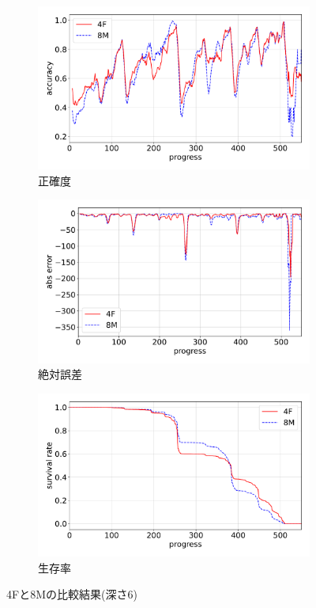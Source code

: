 \begin{figure}[t]
\centering
\begin{subfigure}[b]{0.8\linewidth}
    \includegraphics[width=\linewidth]{pdf/compare/EXP6_NT4F_and_NT8M/accuracy.pdf}
    \caption{正確度}
    \label{fig:EXP6_NT4F_and_NT8M_accuracy}
\end{subfigure}
\begin{subfigure}[b]{0.8\linewidth}
    \includegraphics[width=\linewidth]{pdf/compare/EXP6_NT4F_and_NT8M/error_abs.pdf}
    \caption{絶対誤差}
    \label{fig:EXP6_NT4F_and_NT8M_error_abs}
\end{subfigure}
\begin{subfigure}[b]{0.8\linewidth}
    \includegraphics[width=\linewidth]{pdf/compare/EXP6_NT4F_and_NT8M/survival.pdf}
    \caption{生存率}
    \label{fig:EXP6_NT4F_and_NT8M_survival}
\end{subfigure}
\caption{4Fと8Mの比較結果(深さ6)}
\label{fig:EXP6_NT4FとNT8M_results}
\end{figure}
    

